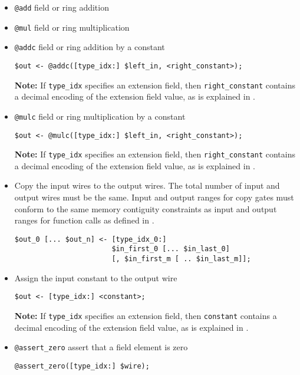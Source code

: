 \begin{itemize}
  \item \texttt{@add} field or ring addition
  \item \texttt{@mul} field or ring multiplication
  \item \texttt{@addc} field or ring addition by a constant
        \begin{lstlisting}[language=ir]
$out <- @addc([type_idx:] $left_in, <right_constant>);
        \end{lstlisting}

        \textbf{Note:} If \texttt{type\_idx} specifies an extension field, then
        \texttt{right\_constant} contains a decimal encoding of the extension
        field value, as is explained in .
  \item \texttt{@mulc} field or ring multiplication by a constant
        \begin{lstlisting}[language=ir]
$out <- @mulc([type_idx:] $left_in, <right_constant>);
            \end{lstlisting}

        \textbf{Note:} If \texttt{type\_idx} specifies an extension field, then
        \texttt{right\_constant} contains a decimal encoding of the extension
        field value, as is explained in .
    \item Copy the input wires to the output wires. The total number of input and output wires must be the same. Input and output ranges for copy gates must conform to the same memory contiguity constraints as input and output ranges for function calls as defined in .
        \begin{lstlisting}[language=ir]
$out_0 [... $out_n] <- [type_idx_0:]
                       $in_first_0 [... $in_last_0]
                       [, $in_first_m [ .. $in_last_m]];
        \end{lstlisting}
  \item Assign the input constant to the output wire
        \begin{lstlisting}[language=ir]
$out <- [type_idx:] <constant>;
        \end{lstlisting}

        \textbf{Note:} If \texttt{type\_idx} specifies an extension field, then
        \texttt{constant} contains a decimal encoding of the extension
        field value, as is explained in .
  \item \texttt{@assert\_zero} assert that a field element is zero
        \begin{lstlisting}[language=ir]
@assert_zero([type_idx:] $wire);
        \end{lstlisting}
\end{itemize}

